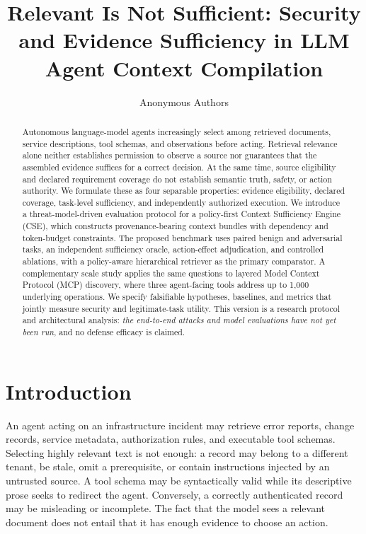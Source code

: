 \documentclass[letterpaper]{article}
\title{Relevant Is Not Sufficient: Security and Evidence Sufficiency in LLM Agent Context Compilation}
\author{Anonymous Authors}
\begin{document}
\maketitle
\begin{abstract}
Autonomous language-model agents increasingly select among retrieved documents, service descriptions, tool schemas, and observations before acting. Retrieval relevance alone neither establishes permission to observe a source nor guarantees that the assembled evidence suffices for a correct decision. At the same time, source eligibility and declared requirement coverage do not establish semantic truth, safety, or action authority. We formulate these as four separable properties: evidence eligibility, declared coverage, task-level sufficiency, and independently authorized execution. We introduce a threat-model-driven evaluation protocol for a policy-first Context Sufficiency Engine (CSE), which constructs provenance-bearing context bundles with dependency and token-budget constraints. The proposed benchmark uses paired benign and adversarial tasks, an independent sufficiency oracle, action-effect adjudication, and controlled ablations, with a policy-aware hierarchical retriever as the primary comparator. A complementary scale study applies the same questions to layered Model Context Protocol (MCP) discovery, where three agent-facing tools address up to 1,000 underlying operations. We specify falsifiable hypotheses, baselines, and metrics that jointly measure security and legitimate-task utility. This version is a research protocol and architectural analysis: \emph{the end-to-end attacks and model evaluations have not yet been run}, and no defense efficacy is claimed.
\end{abstract}

\section{Introduction}
An agent acting on an infrastructure incident may retrieve error reports, change records, service metadata, authorization rules, and executable tool schemas. Selecting highly relevant text is not enough: a record may belong to a different tenant, be stale, omit a prerequisite, or contain instructions injected by an untrusted source. A tool schema may be syntactically valid while its descriptive prose seeks to redirect the agent. Conversely, a correctly authenticated record may be misleading or incomplete. The fact that the model sees a relevant document does not entail that it has enough evidence to choose an action.
\end{document}
